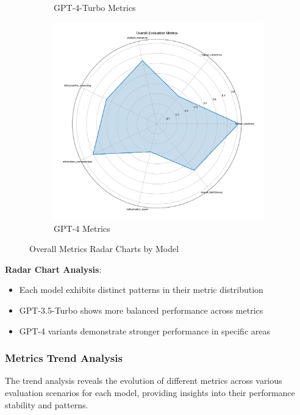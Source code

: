 \begin{figure}[!htbp]
\begin{subfigure}{0.3\textwidth}
    \caption{GPT-4-Turbo Metrics}
    \label{fig:overall_metrics_radar_gpt4t}
\end{subfigure}
\begin{subfigure}{0.3\textwidth}
    \includegraphics[width=\textwidth]{figures/overall/overall_metrics_radar_gpt-4.png}
    \caption{GPT-4 Metrics}
    \label{fig:overall_metrics_radar_gpt4}
\end{subfigure}
\caption{Overall Metrics Radar Charts by Model}
\label{fig:overall_metrics_radar}
\end{figure}

\textbf{Radar Chart Analysis}:
\begin{itemize}
    \item Each model exhibits distinct patterns in their metric distribution
    \item GPT-3.5-Turbo shows more balanced performance across metrics
    \item GPT-4 variants demonstrate stronger performance in specific areas
\end{itemize}

\subsubsection{Metrics Trend Analysis}
The trend analysis reveals the evolution of different metrics across various evaluation scenarios for each model, providing insights into their performance stability and patterns.

